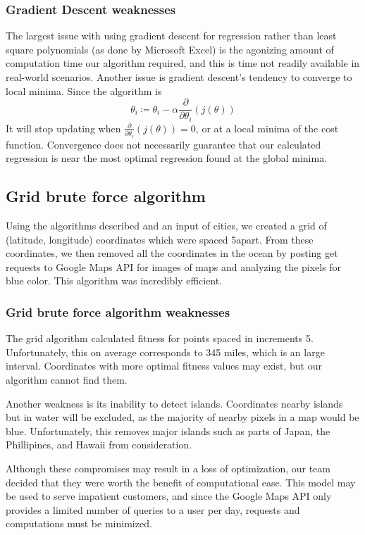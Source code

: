 \subsubsection*{Gradient Descent weaknesses}
The largest issue with using gradient descent for regression rather than least square polynomials (as done by Microsoft Excel) is the agonizing amount of computation time our algorithm required, and this is time not readily available in real-world scenarios. Another issue is gradient descent's tendency to converge to local minima. Since the algorithm is
$$\theta_i \coloneqq \theta_i - \alpha \frac{\partial}{\partial \theta_i}(j(\theta))$$
It will stop updating when $\frac{\partial}{\partial \theta_i}(j(\theta)) = 0$, or at a local minima of the cost function. Convergence does not necessarily guarantee that our calculated regression is near the most optimal regression found at the global minima.


\subsection{Grid brute force algorithm}
Using the algorithms described and an input of cities, we created a grid of (latitude, longitude) coordinates which were spaced 5\degree apart. From these coordinates, we then removed all the coordinates in the ocean by posting get requests to Google Maps API for images of maps and analyzing the pixels for blue color. This algorithm was incredibly efficient. 


\subsubsection*{Grid brute force algorithm weaknesses}
The grid algorithm calculated fitness for points spaced in increments 5\degree . Unfortunately, this on average corresponds to 345 miles, which is an large interval. Coordinates with more optimal fitness values may exist, but our algorithm cannot find them. 


Another weakness is its inability to detect islands. Coordinates nearby islands but in water will be excluded, as the majority of nearby pixels in a map would be blue. Unfortunately, this removes major islands such as parts of Japan, the Phillipines, and Hawaii from consideration. 


Although these compromises may result in a loss of optimization, our team decided that they were worth the benefit of computational ease. This model may be used to serve impatient customers, and since the Google Maps API only provides a limited number of queries to a user per day, requests and computations must be minimized.

